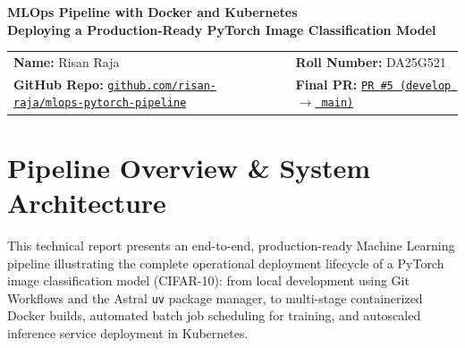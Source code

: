 \documentclass[10pt,a4paper]{article}
\begin{document}
\begin{center}
    {\fontsize{16}{20}\selectfont \textbf{\textcolor{primarydark}{MLOps Pipeline with Docker and Kubernetes}}}\\[2pt]
    {\fontsize{11.5}{14.5}\selectfont \textbf{\textcolor{deepblue}{Deploying a Production-Ready PyTorch Image Classification Model}}}\\[5pt]
\end{center}

\begin{metadatabox}
    \small
    \begin{tabular*}{\linewidth}{@{\extracolsep{\fill}}ll@{}}
        \textbf{Name:} Risan Raja & \textbf{Roll Number:} DA25G521 \\[2pt]
        \textbf{GitHub Repo:} \href{https://github.com/risan-raja/mlops-pytorch-pipeline}{\small\texttt{github.com/risan-raja/mlops-pytorch-pipeline}} & \textbf{Final PR:} \href{https://github.com/risan-raja/mlops-pytorch-pipeline/pull/5}{\small\texttt{PR \#5 (develop $\rightarrow$ main)}}
    \end{tabular*}
\end{metadatabox}

\vspace{1pt}

\section{Pipeline Overview \& System Architecture}

This technical report presents an end-to-end, production-ready Machine Learning pipeline illustrating the complete operational deployment lifecycle of a PyTorch image classification model (CIFAR-10): from local development using Git Workflows and the Astral \texttt{uv} package manager, to multi-stage containerized Docker builds, automated batch job scheduling for training, and autoscaled inference service deployment in Kubernetes.
\end{document}
